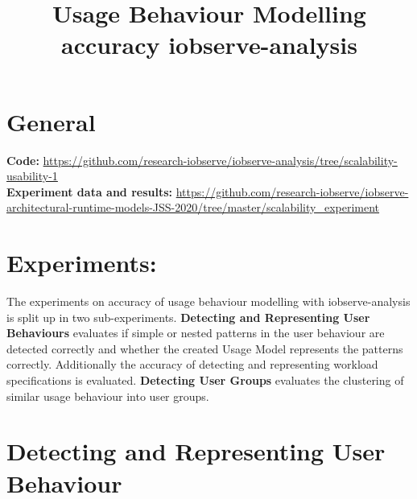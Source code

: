 \documentclass[10pt,a4paper]{article}
\begin{document}
\title{Usage Behaviour Modelling\\accuracy iobserve-analysis}
\date{}
\maketitle

	\section{General}
	\textbf{Code:} \url{https://github.com/research-iobserve/iobserve-analysis/tree/scalability-usability-1}\\
	\textbf{Experiment data and results:} \url{https://github.com/research-iobserve/iobserve-architectural-runtime-models-JSS-2020/tree/master/scalability_experiment}
	
	\section{Experiments:}
	The experiments on accuracy of usage behaviour modelling with iobserve-analysis is split up in two sub-experiments. \textbf{Detecting and Representing User Behaviours} evaluates if simple or nested patterns in the user behaviour are detected correctly and whether the created Usage Model represents the patterns correctly. Additionally the accuracy of detecting and representing workload specifications is evaluated. \textbf{Detecting User Groups} evaluates the clustering of similar usage behaviour into user groups.

	\section{Detecting and Representing User Behaviour}
\end{document}
